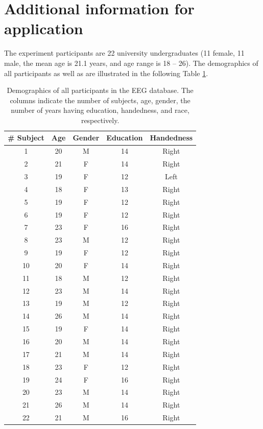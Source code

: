 \documentclass[11pt]{article}
\begin{document}
\section{Additional information for application}
The experiment participants are 22 university undergraduates (11 female, 11 male, the mean age is 21.1 years, and age range is 18 -- 26). The demographics of all participants as well as are illustrated in the following Table \ref{tab:demographics}. 
\begin{table}[!ht]
    \centering
    \caption{Demographics of all participants in the EEG database. The columns indicate the number of subjects, age, gender, the number of years having education, handedness, and race, respectively.}
    \label{tab:demographics}
    \begin{tabular}{c|c|c|c|c}
    \hline\hline
        \# Subject & Age & Gender & Education & Handedness \\
    \hline
        1 & 20 & M & 14 & Right \\
        2 & 21 & F & 14 & Right \\
        3 & 19 & F & 12 & Left \\
        4 & 18 & F & 13 & Right \\
        5 & 19 & F & 12 & Right \\
        6 & 19 & F & 12 & Right \\
        7 & 23 & F & 16 & Right \\
        8 & 23 & M & 12 & Right \\
        9 & 19 & F & 12 & Right \\
        10 & 20 & F & 14 & Right \\
        11 & 18 & M & 12 & Right \\
        12 & 23 & M & 14 & Right \\
        13 & 19 & M & 12 & Right \\
        14 & 26 & M & 14 & Right \\
        15 & 19 & F & 14 & Right \\
        16 & 20 & M & 14 & Right \\
        17 & 21 & M & 14 & Right \\
        18 & 23 & F & 12 & Right \\
        19 & 24 & F & 16 & Right \\
        20 & 23 & M & 14 & Right \\
        21 & 26 & M & 14 & Right \\
        22 & 21 & M & 16 & Right \\
    \hline\hline
    \end{tabular}
\end{table}
\end{document}
